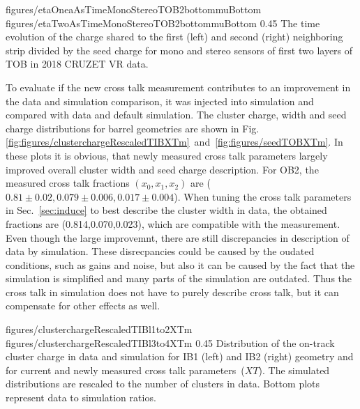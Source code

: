                  {figures/etaOneaAsTimeMonoStereoTOB2bottommuBottom}
                 {figures/etaTwoAsTimeMonoStereoTOB2bottommuBottom} %
                 {0.45}       %
                 { The time evolution of the charge shared to the first (left) and second (right) neighboring strip divided by the seed charge for mono and stereo sensors of first two layers of TOB in 2018 CRUZET VR data.}



To evaluate if the new cross talk measurement contributes to an improvement in the data and simulation comparison, it was injected into simulation and compared with data and default simulation. The cluster charge, width and seed charge distributions for barrel geometries are shown in Fig.\ref{fig:figures/clusterchargeRescaledTIBXTm}~and~\ref{fig:figures/seedTOBXTm}. In these plots it is obvious, that newly measured cross talk parameters largely improved overall cluster width and seed charge description. For OB2, the measured cross talk fractions $(x_{0}, x_{1}, x_{2})$ are ($0.81 \pm 0.02 , 0.079 \pm 0.006, 0.017 \pm 0.004$). When tuning the cross talk parameters in Sec.~\ref{sec:induce} to best describe the cluster width in data, the obtained fractions are (0.814,0.070,0.023), which are compatible with the measurement. Even though the large improvemnt, there are still discrepancies in description of data by simulation. These disrecpancies could be caused by the oudated conditions, such as gains and noise, but also it can be caused by the fact that the simulation is simplified and many parts of the simulation are outdated. Thus the cross talk in simulation does not have to purely describe cross talk, but it can compensate for other effects as well. 



                 {figures/clusterchargeRescaledTIBl1to2XTm} %
                 {figures/clusterchargeRescaledTIBl3to4XTm} %
                 {0.45}       %
                 { Distribution of the on-track cluster charge in data and simulation for IB1 (left) and IB2 (right) geometry and for current and newly measured cross talk parameters~($XT$).  The simulated distributions are rescaled to the number of clusters in data.  Bottom plots represent data to simulation ratios. }

